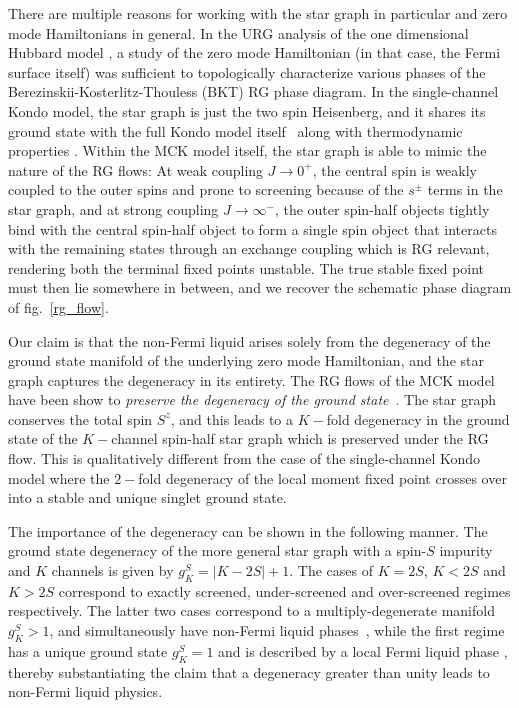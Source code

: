 \documentclass[reprint,prb,superscriptaddress]{revtex4-2}
\begin{document}
There are multiple reasons for working with the star graph in particular and zero mode Hamiltonians in general. In the URG analysis of the one dimensional Hubbard model \cite{1dhubjhep}, a study of the zero mode Hamiltonian (in that case, the Fermi surface itself) was sufficient to topologically characterize various phases of the Berezinskii-Kosterlitz-Thouless (BKT) RG phase diagram. In the single-channel Kondo model, the star graph is just the two spin Heisenberg, and it shares its ground state with the full Kondo model itself~\cite{varma_yafet_1976,yosida_1966,wilson1975renormalization} along with thermodynamic properties \cite{varma_yafet_1976,kondo_urg}. Within the MCK model itself, the star graph is able to mimic the nature of the RG flows: At weak coupling \(J \to 0^+\), the central spin is weakly coupled to the outer spins and  prone to screening because of the \(s^\pm\) terms in the star graph, and at strong coupling \(J \to \infty^-\), the outer spin-half objects tightly bind with the central spin-half object to form a single spin object that interacts with the remaining states through an exchange coupling which is RG relevant, rendering both the terminal fixed points unstable. The true stable fixed point must then lie somewhere in between, and we recover the schematic phase diagram of fig.~\ref{rg_flow}. 

Our claim is that the non-Fermi liquid arises solely from the degeneracy of the ground state manifold of the underlying zero mode Hamiltonian, and the star graph captures the degeneracy in its entirety. The RG flows of the MCK model have been show to \textit{preserve the degeneracy of the ground state}~\cite{pang_cox_1991,kroha_kolf_2007,zitko_fabrizio_2017,moca_zarand_2021}\textcolor{red}. The star graph conserves the total spin \(S^z\), and this leads to a \(K-\)fold degeneracy in the ground state of the \(K-\)channel spin-half star graph which is preserved under the RG flow. This is qualitatively different from the case of the single-channel Kondo model where the \(2-\)fold degeneracy of the local moment fixed point crosses over into a stable and unique singlet ground state. 

The importance of the degeneracy can be shown in the following manner. The ground state degeneracy of the more general star graph with a spin-\(S\) impurity and \(K\) channels is given by \(g^S_K = |K - 2S|+1\). The cases of \(K=2S\), \(K<2S\) and \(K>2S\) correspond to exactly screened, under-screened and over-screened regimes respectively. The latter two cases correspond to a multiply-degenerate manifold \(g^S_K > 1\), and simultaneously have non-Fermi liquid phases~\cite{Noz_blandin_1980,Gan_Andrei_Coleman_1993,emery_kivelson,Gan_mchannel_1994,Tsvelick_Weigmann_mchannel_1984,Tsvelick_weigmann_mchannel_1985,parcollet_olivier_large_N,kimura_taro_Su_N_kondo,PhysRevB.73.224445,cox_jarrell_two_channel_rev,affleck_1991_overscreen,Coleman_tsvelik,affleck1993exact,coleman_pepin_2003,roch_nicolas_costi_2009,schiller_avraham_2008,Durganandini_2011}, while the first regime has a unique ground state \(g^S_K = 1\) and is described by a local Fermi liquid phase \cite{wilson1975,nozieres1974fermi,Noz_blandin_1980,andreiKondoreview,tsvelickKondoreview}, thereby substantiating the claim that a degeneracy greater than unity leads to non-Fermi liquid physics.
\end{document}
